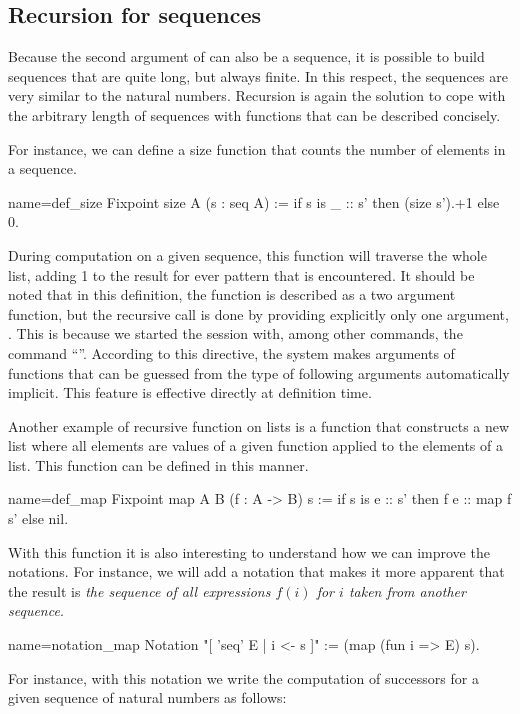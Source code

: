 \subsection{Recursion for sequences}
Because the second argument of  can also be a sequence, it is
possible to build sequences that are quite long, but always finite.
In this respect, the sequences are very similar to the natural
numbers.  Recursion is again the solution to cope with the arbitrary
length of sequences with functions that can be described concisely.

For instance, we can define a size function that counts the number of
elements in a sequence.

\begin{coq}{name=def_size}{}
Fixpoint size A (s : seq A) :=
  if s is _ :: s' then (size s').+1 else 0.
\end{coq}
During computation on a given sequence, this function will traverse
the whole list, adding 1 to the result for ever
 pattern that is encountered.  It should be noted that in this
definition, the function  is described as a two argument
function, but the recursive call  is done by providing
explicitly only one argument, .  This is because we started the
\Coq{} session with, among other commands, the command ``''.  According to this directive, the \Coq{} system makes
arguments of functions that can be guessed from the type of following
arguments automatically implicit.  This feature is effective directly
at definition time.

Another example of recursive function on lists is a function that constructs
a new list where all elements are values of a given function applied to
the elements of a list.  This function can be defined in this
manner.

\begin{coq}{name=def_map}{}
Fixpoint map A B (f : A -> B) s :=
  if s is e :: s' then f e :: map f s' else nil.
\end{coq}
With this function it is also interesting to understand how we can
improve the notations.  For instance, we will add a notation that
makes it more apparent that the result is {\em the sequence of all
expressions \(f(i)\) for \(i\) taken from another sequence}.

\begin{coq}{name=notation_map}{}
Notation "[ 'seq' E | i <- s ]" := (map (fun i => E) s).
\end{coq}
For instance, with this notation we write the computation of successors
for a given sequence of natural numbers as follows:

